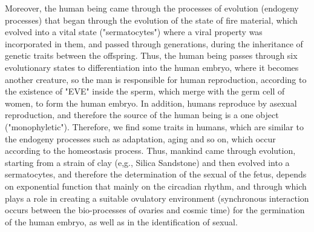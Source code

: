 \begin{Summary}
{{{{Moreover, the human being came through the processes of evolution (endogeny processes) that began through the evolution of the state of fire material, which evolved into a vital state ("sermatocytes") where a viral property was incorporated in them, and passed through generations, during the inheritance of genetic traits between the offspring. Thus, the human being passes through six evolutionary states to differentiation into the human embryo, where it becomes another creature, so the man is responsible for human reproduction, according to the existence of "EVE" inside the sperm, which merge with the germ cell of women, to form the human embryo. In addition, humans reproduce by asexual reproduction, and therefore the source of the human being is a one object ("monophyletic"). Therefore, we find some traits in humans, which are similar to the endogeny processes such as adaptation, aging and so on, which occur according to the homeostasis process. Thus, mankind came through evolution, starting from a strain of clay (e,g., Silica Sandstone) and then evolved into a sermatocytes, and therefore the determination of the sexual of the fetus, depends on exponential function that mainly on the circadian rhythm, and through which plays a role in creating a suitable ovulatory environment (synchronous interaction occurs between the bio-processes of ovaries and cosmic time) for the germination of the human embryo, as well as in the identification of sexual.

}}}}
\end{Summary}

